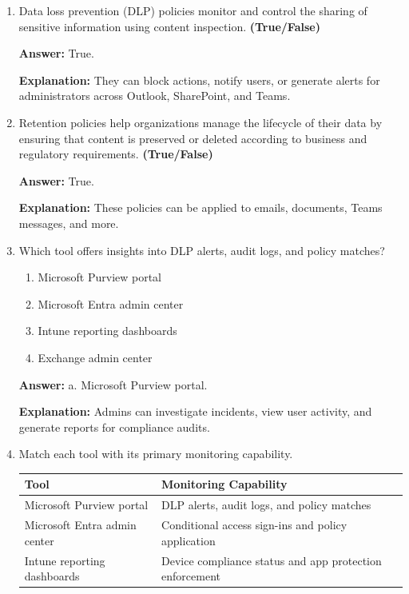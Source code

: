 \documentclass[10pt]{article}
\begin{document}
\begin{enumerate}[leftmargin=*]
\item Data loss prevention (DLP) policies monitor and control the sharing of sensitive information using content inspection. \textbf{(True/False)}

\textbf{Answer:} True.

\textbf{Explanation:} They can block actions, notify users, or generate alerts for administrators across Outlook, SharePoint, and Teams.

\item Retention policies help organizations manage the lifecycle of their data by ensuring that content is preserved or deleted according to business and regulatory requirements. \textbf{(True/False)}

\textbf{Answer:} True.

\textbf{Explanation:} These policies can be applied to emails, documents, Teams messages, and more.

\item Which tool offers insights into DLP alerts, audit logs, and policy matches?
\begin{enumerate}[label=\alph*., leftmargin=1.5em]
\item Microsoft Purview portal
\item Microsoft Entra admin center
\item Intune reporting dashboards
\item Exchange admin center
\end{enumerate}
\textbf{Answer:} a. Microsoft Purview portal.

\textbf{Explanation:} Admins can investigate incidents, view user activity, and generate reports for compliance audits.

\item Match each tool with its primary monitoring capability.

\begin{center}
\begin{tabular}{>{\raggedright\arraybackslash}p{} >{\raggedright\arraybackslash}p{}}
\toprule
\textbf{Tool} & \textbf{Monitoring Capability} \\
\midrule
Microsoft Purview portal & DLP alerts, audit logs, and policy matches \\
Microsoft Entra admin center & Conditional access sign-ins and policy application \\
Intune reporting dashboards & Device compliance status and app protection enforcement \\
\bottomrule
\end{tabular}
\end{center}


\end{enumerate}
\end{document}
